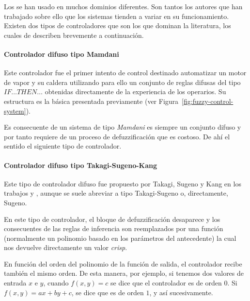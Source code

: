 Los  se han usado en muchos dominios diferentes. Son tantos los autores que han trabajado sobre ello que los sistemas tienden a variar en su funcionamiento. Existen dos tipos de controladores que son los que dominan la literatura, los cuales de describen brevemente a continuación.

\paragraph{Controlador difuso tipo Mamdani}

Este controlador fue el primer intento de control destinado automatizar un motor de vapor y su caldera utilizando para ello un conjunto de reglas difusas del tipo \texttt{$IF \ldots THEN \ldots$} obtenidas directamente de la experiencia de los operarios. Su estructura es la básica presentada previamente (ver Figura~\ref{fig:fuzzy-control-system}).

Es consecuente de un sistema de tipo \textit{Mamdani} es siempre un conjunto difuso y por tanto requiere de un proceso de defuzzificación que es costoso. De ahí el sentido el siguiente tipo de controlador.

\paragraph{Controlador difuso tipo Takagi-Sugeno-Kang}

Este tipo de controlador difuso fue propuesto por Takagi, Sugeno y Kang en los trabajos \cite{takagi1993fuzzy} y \cite{sugeno1988structure}, aunque se suele abreviar a tipo Takagi-Sugeno o, directamente, Sugeno.

En este tipo de controlador, el bloque de defuzzificación desaparece y los consecuentes de las reglas de inferencia son reemplazados por una función (normalmente un polinomio basado en los parámetros del antecedente) la cual nos devuelve directamente un valor \textit{crisp}.

En función del orden del polinomio de la función de salida, el controlador recibe también el mismo orden. De esta manera, por ejemplo, si tenemos dos valores de entrada $x$ e $y$, cuando $f(x, y) = c$ se dice que el controlador es de orden $0$. Si $f(x, y) = ax + by + c$, se dice que es de orden $1$, y así sucesivamente.

